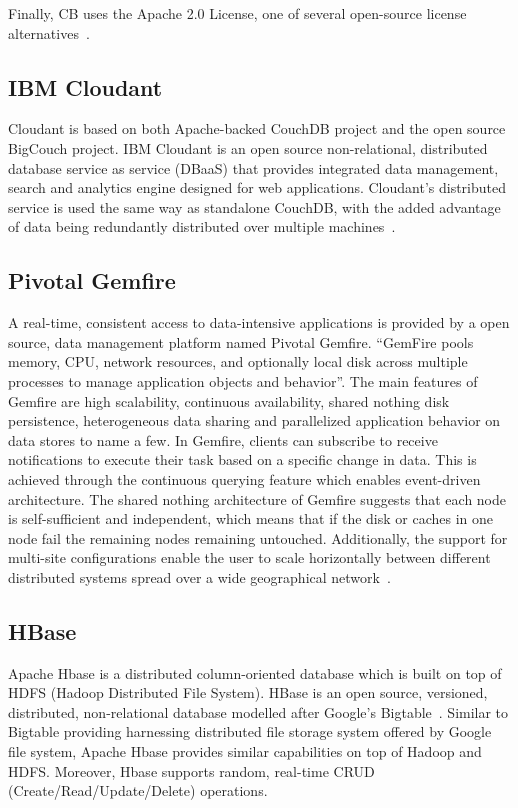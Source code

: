 Finally, CB uses the Apache 2.0 License, one of several open-source
license alternatives~\cite{www-quora-cbs}.


     \pv

\subsection{IBM Cloudant}
     
Cloudant is based on both Apache-backed CouchDB project and the open
source BigCouch project. IBM Cloudant is an open source
non-relational, distributed database service as service (DBaaS) that
provides integrated data management, search and analytics engine
designed for web applications. Cloudant's distributed service is used
the same way as standalone CouchDB, with the added advantage of data
being redundantly distributed over multiple
machines~\cite{www-ibm-cloudant}.
   

\subsection{Pivotal Gemfire}
     
A real-time, consistent access to data-intensive applications is
provided by a open source, data management platform named Pivotal
Gemfire. ``GemFire pools memory, CPU, network resources, and
optionally local disk across multiple processes to manage application
objects and behavior''. The main features of Gemfire are high
scalability, continuous availability, shared nothing disk persistence,
heterogeneous data sharing and parallelized application behavior on
data stores to name a few.  In Gemfire, clients can subscribe to
receive notifications to execute their task based on a specific change
in data. This is achieved through the continuous querying feature
which enables event-driven architecture. The shared nothing
architecture of Gemfire suggests that each node is self-sufficient and
independent, which means that if the disk or caches in one node fail
the remaining nodes remaining untouched. Additionally, the support for
multi-site configurations enable the user to scale horizontally
between different distributed systems spread over a wide geographical
network~\cite{www-gemfire}.
     
\subsection{HBase}

Apache Hbase is a distributed column-oriented database which is built
on top of HDFS (Hadoop Distributed File System). HBase is an open
source, versioned, distributed, non-relational database modelled after
Google’s Bigtable~\cite{www-hbase}. Similar to Bigtable providing
harnessing distributed file storage system offered by Google file
system, Apache Hbase provides similar capabilities on top of Hadoop
and HDFS. Moreover, Hbase supports random, real-time CRUD
(Create/Read/Update/Delete) operations.

